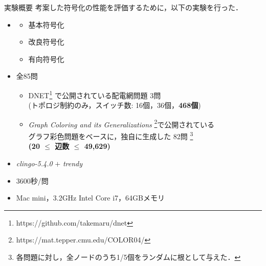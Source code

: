 \documentclass[dvipdfmx,11pt]{beamer}
\begin{document}
\begin{frame}{実験概要}
  \renewcommand{\thefootnote}{\fnsymbol{footnote}}
  \setcounter{footnote}{1}
  考案した符号化の性能を評価するために，以下の実験を行った．
  \begin{itemize}
  \item {}
    \begin{itemize}
	 \item 基本符号化
	 \item 改良符号化
	 \item 有向符号化
    \end{itemize}
  \item {} 全85問
    \begin{itemize}
    \item DNET\footnote{https://github.com/takemaru/dnet}%
      で公開されている配電網問題 3問 \\ (トポロジ制約のみ，スイッチ数:
      16個，36個，\alert{\bf 468個})
    \item \textit{Graph Coloring and its Generalizations}
      \footnote{https://mat.tepper.cmu.edu/COLOR04/}で公開されている \\
      グラフ彩色問題をベースに，独自に生成した 82問 
      \footnote{各問題に対し，全ノードのうち1/5個をランダムに根として与えた．}\\
      \alert{\bf (20 $\leq$ 辺数 $\leq$ 49,629)}
    \end{itemize}
  \item {} \textit{clingo-5.4.0} $+$ \textit{trendy}
  \item {} 3600秒/問
  \item {} Mac mini，3.2GHz Intel Core i7，64GBメモリ
  \end{itemize}
\end{frame}
\end{document}
